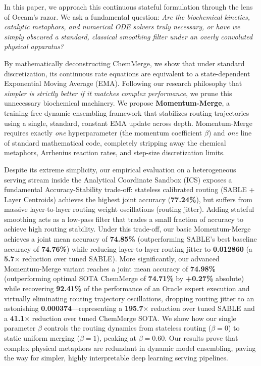 In this paper, we approach this continuous stateful formulation through the lens of Occam's razor. We ask a fundamental question: \emph{Are the biochemical kinetics, catalytic metaphors, and numerical ODE solvers truly necessary, or have we simply obscured a standard, classical smoothing filter under an overly convoluted physical apparatus?} 

By mathematically deconstructing ChemMerge, we show that under standard discretization, its continuous rate equations are equivalent to a state-dependent Exponential Moving Average (EMA). Following our research philosophy that \emph{simpler is strictly better if it matches complex performance}, we prune this unnecessary biochemical machinery. We propose \textbf{Momentum-Merge}, a training-free dynamic ensembling framework that stabilizes routing trajectories using a single, standard, constant EMA update across depth. Momentum-Merge requires exactly \emph{one} hyperparameter (the momentum coefficient $\beta$) and \emph{one} line of standard mathematical code, completely stripping away the chemical metaphors, Arrhenius reaction rates, and step-size discretization limits.

Despite its extreme simplicity, our empirical evaluation on a heterogeneous serving stream inside the Analytical Coordinate Sandbox (ICS) exposes a fundamental Accuracy-Stability trade-off: stateless calibrated routing (SABLE + Layer Centroids) achieves the highest joint accuracy (\textbf{77.24\%}), but suffers from massive layer-to-layer routing weight oscillations (routing jitter). Adding stateful smoothing acts as a low-pass filter that trades a small fraction of accuracy to achieve high routing stability. Under this trade-off, our basic Momentum-Merge achieves a joint mean accuracy of \textbf{74.85\%} (outperforming SABLE's best baseline accuracy of \textbf{74.76\%}) while reducing layer-to-layer routing jitter to \textbf{0.012860} (a \textbf{5.7$\times$} reduction over tuned SABLE). More significantly, our advanced Momentum-Merge variant reaches a joint mean accuracy of \textbf{74.98\%} (outperforming optimal SOTA ChemMerge of \textbf{74.71\%} by \textbf{+0.27\%} absolute) while recovering \textbf{92.41\%} of the performance of an Oracle expert execution and virtually eliminating routing trajectory oscillations, dropping routing jitter to an astonishing \textbf{0.000374}---representing a \textbf{195.7$\times$} reduction over tuned SABLE and a \textbf{41.1$\times$} reduction over tuned ChemMerge SOTA. We show how our single parameter $\beta$ controls the routing dynamics from stateless routing ($\beta=0$) to static uniform merging ($\beta=1$), peaking at $\beta = 0.60$. Our results prove that complex physical metaphors are redundant in dynamic model ensembling, paving the way for simpler, highly interpretable deep learning serving pipelines.

